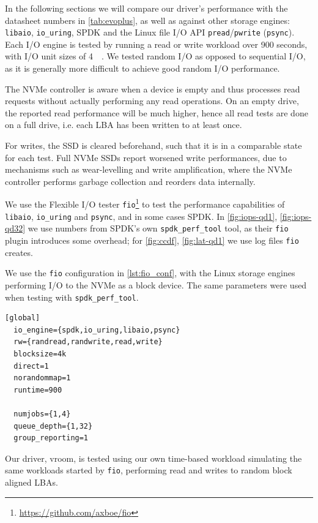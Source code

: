 In the following sections we will compare our driver's performance with the datasheet numbers in \autoref{tab:evoplus}, as well as against other storage engines: \texttt{libaio}, \texttt{io\_uring}, SPDK and the Linux file I/O API \texttt{pread}/\texttt{pwrite} (\texttt{psync}). Each I/O engine is tested by running a read or write workload over 900 seconds, with I/O unit sizes of \qty{4}{\kibi\byte}. We tested random I/O as opposed to sequential I/O, as it is generally more difficult to achieve good random I/O performance.

The NVMe controller is aware when a device is empty and thus processes read requests without actually performing any read operations. On an empty drive, the reported read performance will be much higher, hence all read tests are done on a full drive, i.e. each LBA has been written to at least once.

For writes, the SSD is cleared beforehand, such that it is in a comparable state for each test. Full NVMe SSDs report worsened write performances, due to mechanisms such as wear-levelling and write amplification, where the NVMe controller performs garbage collection and reorders data internally.


We use the Flexible I/O tester \texttt{fio}\footnote{\url{https://github.com/axboe/fio}} to test the performance capabilities of \texttt{libaio}, \texttt{io\_uring} and \texttt{psync}, and in some cases SPDK. In \autoref{fig:iops-qd1}, \autoref{fig:iops-qd32} we use numbers from SPDK's own \texttt{spdk\_perf\_tool} tool, as their \texttt{fio} plugin introduces some overhead; for \autoref{fig:ccdf}, \autoref{fig:lat-qd1} we use log files \texttt{fio} creates.

We use the \texttt{fio} configuration in \autoref{lst:fio_conf}, with the Linux storage engines performing I/O to the NVMe as a block device. The same parameters were used when testing with \texttt{spdk\_perf\_tool}.

\begin{lstlisting}[float, label=lst:fio_conf, caption=\texttt{fio} configuration]
  [global]
  io_engine={spdk,io_uring,libaio,psync}
  rw={randread,randwrite,read,write}
  blocksize=4k
  direct=1
  norandommap=1
  runtime=900

  numjobs={1,4}
  queue_depth={1,32}
  group_reporting=1
\end{lstlisting}

Our driver, vroom, is tested using our own time-based workload simulating the same workloads started by \texttt{fio}, performing read and writes to random block aligned LBAs.

